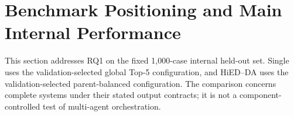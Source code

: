 \section{Benchmark Positioning and Main Internal Performance}
\label{sec:validation-retrieval-selection}
\label{sec:matched-baselines-retrieval}

This section addresses RQ1 on the fixed 1,000-case internal held-out set. Single uses the validation-selected global Top-5 configuration, and HiED--DA uses the validation-selected parent-balanced configuration. The comparison concerns complete systems under their stated output contracts; it is not a component-controlled test of multi-agent orchestration.

